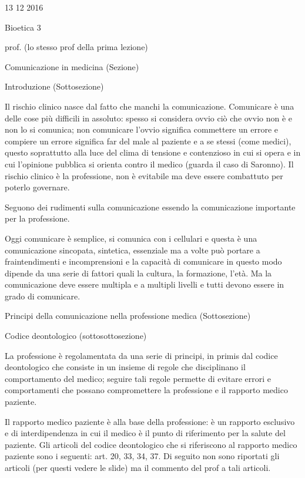 \documentclass[]{article}
\date{}
\begin{document}
13 12 2016

Bioetica 3

prof. (lo stesso prof della prima lezione)

Comunicazione in medicina (Sezione)

Introduzione (Sottosezione)

Il rischio clinico nasce dal fatto che manchi la comunicazione.
Comunicare è una delle cose più difficili in assoluto: spesso si
considera ovvio ciò che ovvio non è e non lo si comunica; non comunicare
l'ovvio significa commettere un errore e compiere un errore significa
far del male al paziente e a se stessi (come medici), questo soprattutto
alla luce del clima di tensione e contenzioso in cui si opera e in cui
l'opinione pubblica si orienta contro il medico (guarda il caso di
Saronno). Il rischio clinico è la professione, non è evitabile ma deve
essere combattuto per poterlo governare.

Seguono dei rudimenti sulla comunicazione essendo la comunicazione
importante per la professione.

Oggi comunicare è semplice, si comunica con i cellulari e questa è una
comunicazione sincopata, sintetica, essenziale ma a volte può portare a
fraintendimenti e incomprensioni e la capacità di comunicare in questo
modo dipende da una serie di fattori quali la cultura, la formazione,
l'età. Ma la comunicazione deve essere multipla e a multipli livelli e
tutti devono essere in grado di comunicare.

Principi della comunicazione nella professione medica (Sottosezione)

Codice deontologico (sottosottosezione)

La professione è regolamentata da una serie di principi, in primis dal
codice deontologico che consiste in un insieme di regole che
disciplinano il comportamento del medico; seguire tali regole permette
di evitare errori e comportamenti che possano compromettere la
professione e il rapporto medico paziente.

Il rapporto medico paziente è alla base della professione: è un rapporto
esclusivo e di interdipendenza in cui il medico è il punto di
riferimento per la salute del paziente. Gli articoli del codice
deontologico che si riferiscono al rapporto medico paziente sono i
seguenti: art. 20, 33, 34, 37. Di seguito non sono riportati gli
articoli (per questi vedere le slide) ma il commento del prof a tali
articoli.
\end{document}
